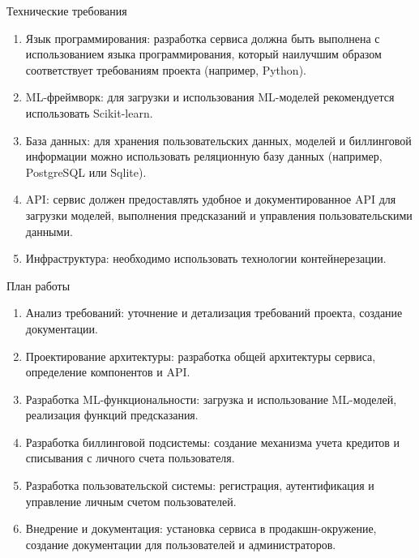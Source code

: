 \documentclass[
  ignorenonframetext,
  aspectratio=169,
  aspectratio=169]{beamer}
\begin{document}
\begin{frame}{Технические требования}
\protect\hypertarget{ux442ux435ux445ux43dux438ux447ux435ux441ux43aux438ux435-ux442ux440ux435ux431ux43eux432ux430ux43dux438ux44f}{}
\begin{enumerate}
\item
  Язык программирования: разработка сервиса должна быть выполнена с
  использованием языка программирования, который наилучшим образом
  соответствует требованиям проекта (например, Python).
\item
  ML-фреймворк: для загрузки и использования ML-моделей рекомендуется
  использовать Scikit-learn.
\item
  База данных: для хранения пользовательских данных, моделей и
  биллинговой информации можно использовать реляционную базу данных
  (например, PostgreSQL или Sqlite).
\item
  API: сервис должен предоставлять удобное и документированное API для
  загрузки моделей, выполнения предсказаний и управления
  пользовательскими данными.
\item
  Инфраструктура: необходимо использовать технологии контейнерезации.
\end{enumerate}
\end{frame}

\begin{frame}{План работы}
\protect\hypertarget{ux43fux43bux430ux43d-ux440ux430ux431ux43eux442ux44b}{}
\begin{enumerate}
\item
  Анализ требований: уточнение и детализация требований проекта,
  создание документации.
\item
  Проектирование архитектуры: разработка общей архитектуры сервиса,
  определение компонентов и API.
\item
  Разработка ML-функциональности: загрузка и использование ML-моделей,
  реализация функций предсказания.
\item
  Разработка биллинговой подсистемы: создание механизма учета кредитов и
  списывания с личного счета пользователя.
\item
  Разработка пользовательской системы: регистрация, аутентификация и
  управление личным счетом пользователей.
\item
  Внедрение и документация: установка сервиса в продакшн-окружение,
  создание документации для пользователей и администраторов.
\end{enumerate}
\end{frame}
\end{document}
